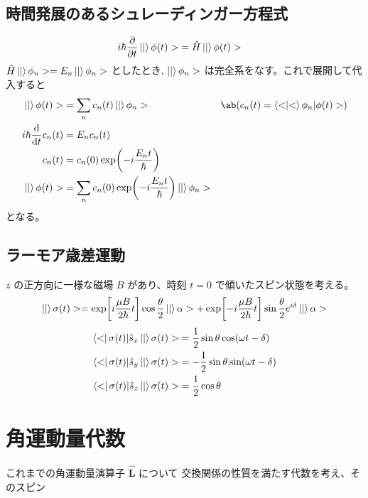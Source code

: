 \documentclass[uplatex,dvipdfmx,a4paper,11pt]{jlreq}
\numberwithin{equation}{section}
\theoremstyle{definition}
\begin{document}
\subsection{時間発展のあるシュレーディンガー方程式}
\begin{align}
  i\hbar\diffp{}{t}\ket|\phi(t)> & = \hat{H}\ket|\phi(t)>
\end{align}
$\hat{H}\ket|\phi_n> = E_n\ket|\phi_n>$ としたとき, $\ket|\phi_n>$ は完全系をなす。これで展開して代入すると
\begin{align}
  \ket|\phi(t)>      & = \sum_nc_n(t)\ket|\phi_n>                           & \ab(c_n(t) = \braket<\phi_n|\phi(t)>) \\
  i\hbar\dv{t}c_n(t) & = E_nc_n(t)                                                                                  \\
  c_n(t)             & = c_n(0)\exp(-i\frac{E_nt}{\hbar})                                                           \\
  \ket|\phi(t)>      & = \sum_nc_n(0)\exp(-i\frac{E_nt}{\hbar})\ket|\phi_n>
\end{align}
となる。


\subsection{ラーモア歳差運動}
$z$ の正方向に一様な磁場 $B$ があり、時刻 $t = 0$ で傾いたスピン状態を考える。
\begin{align}
  \ket|\sigma(t)> = \exp[i\frac{\mu B}{2\hbar}t]\cos\frac{\theta}{2}\ket|\alpha> + \exp[-i\frac{\mu B}{2\hbar}t]\sin\frac{\theta}{2}e^{i\delta}\ket|\alpha>
\end{align}
\begin{align}
  \bra<\sigma(t)|\hat{s}_x\ket|\sigma(t)> & = \frac{1}{2}\sin\theta\cos(\omega t - \delta)  \\
  \bra<\sigma(t)|\hat{s}_y\ket|\sigma(t)> & = -\frac{1}{2}\sin\theta\sin(\omega t - \delta) \\
  \bra<\sigma(t)|\hat{s}_z\ket|\sigma(t)> & = \frac{1}{2}\cos\theta
\end{align}



\section{角運動量代数}
これまでの角運動量演算子 $\hat{\bm{L}}$ について
交換関係の性質を満たす代数を考え、そのスピン
\end{document}

